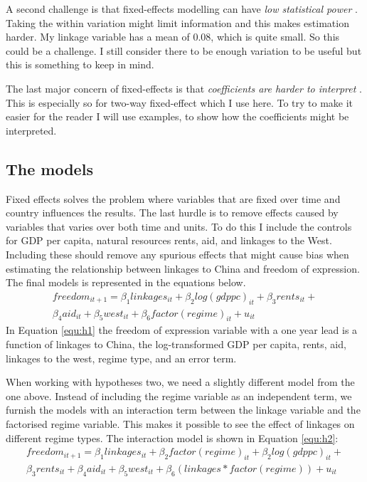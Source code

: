 A second challenge is that fixed-effects modelling can have \textit{low statistical power} \citep[pp. 361-362]{hill_limitations_2020}. Taking the within variation might limit information and this makes estimation harder. My linkage variable has a mean of 0.08, which is quite small. So this could be a challenge. I still consider there to be enough variation to be useful but this is something to keep in mind.

The last major concern of fixed-effects is that \textit{coefficients are harder to interpret} \citep[pp. 364-365]{hill_limitations_2020}. This is especially so for two-way fixed-effect which I use here. To try to make it easier for the reader I will use examples, to show how the coefficients might be interpreted.

\subsection{The models}
Fixed effects solves the problem where variables that are fixed over time and country influences the results. The last hurdle is to remove effects caused by variables that varies over both time and units. To do this I include the controls for GDP per capita, natural resources rents, aid, and linkages to the West. Including these should remove any spurious effects that might cause bias when estimating the relationship between linkages to China and freedom of expression. The final models is represented in the equations below.
\begin{multline} \label{equ:h1}
    freedom_{it+1} = \beta_1  linkages_{it} + \beta_2 log(gdppc)_{it} + \beta_3 rents_{it} + \\\beta_4aid_{it} + \beta_5 west_{it} + \beta_6  factor(regime)_{it} + u_{it}
\end{multline}
In Equation \ref{equ:h1} the freedom of expression variable with a one year lead is a function of  linkages to China, the log-transformed GDP per capita, rents, aid, linkages to the west, regime type, and an error term.

When working with hypotheses two, we need a slightly different model from the one above. Instead of including the regime variable as an independent term, we furnish the models with an interaction term between the linkage variable and the factorised regime variable. This makes it possible to see the effect of linkages on different regime types. The interaction model is shown in Equation \ref{equ:h2}:
\begin{multline} \label{equ:h2}
    freedom_{it+1} = \beta_1 linkages_{it} + \beta_2 factor(regime)_{it} + \beta_2 log(gdppc)_{it} + \\ \beta_3 rents_{it} + \beta_4 aid_{it} + \beta_5 west_{it} + \beta_6 (linkages * factor(regime)) + u_{it}
\end{multline}